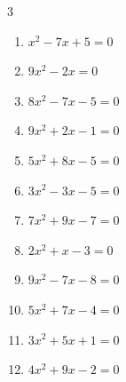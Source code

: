 \begin{multicols}{3}
\begin{enumerate}

  \item $x^{2}-7x+5=0$


\columnbreak %

\resetques

  \item $9x^{2}-2x=0$


  \item $8x^{2}-7x-5=0$


  \item $9x^{2}+2x-1=0$


  \item $5x^{2}+8x-5=0$


  \item $3x^{2}-3x-5=0$


  \item $7x^{2}+9x-7=0$


  \item $2x^{2}+x-3=0$


\columnbreak %

  \item $9x^{2}-7x-8=0$


  \item $5x^{2}+7x-4=0$


  \item $3x^{2}+5x+1=0$


  \item $4x^{2}+9x-2=0$


\end{enumerate}
\end{multicols}
